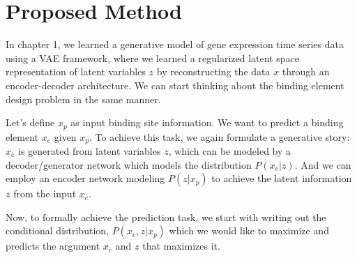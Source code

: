\section{Proposed Method} 
In chapter 1, we learned a generative model of gene expression time
series data using a VAE framework, where we learned a regularized latent space representation of latent
variables $z$ by reconstructing the data $x$ through an encoder-decoder architecture. We can start
thinking about the binding element design problem in the same manner.

Let's define $x_p$ as input binding site information. We want to predict a binding element $x_e$
given $x_p$. To achieve this task, we again formulate a generative story: $x_e$ is generated from
latent variables $z$, which can be modeled by a decoder/generator network which models the
distribution $P(x_e|z)$. And we can employ an encoder network modeling $P(z|x_p)$ to achieve the
latent information $z$ from the input $x_e$.

Now, to formally achieve the prediction task, we start with writing out the conditional distribution,
$P(x_e, z|x_p)$ which we would like to maximize and predicts the argument $x_e$ and $z$ that maximizes it.

